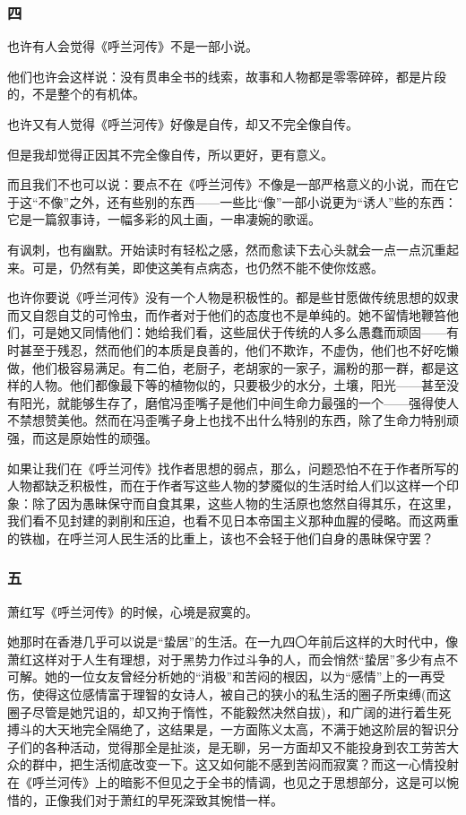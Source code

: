 \subsubsection*{四}
\par 也许有人会觉得《呼兰河传》不是一部小说。
\par 他们也许会这样说：没有贯串全书的线索，故事和人物都是零零碎碎，都是片段的，不是整个的有机体。
\par 也许又有人觉得《呼兰河传》好像是自传，却又不完全像自传。
\par 但是我却觉得正因其不完全像自传，所以更好，更有意义。
\par 而且我们不也可以说：要点不在《呼兰河传》不像是一部严格意义的小说，而在它于这“不像”之外，还有些别的东西——一些比“像”一部小说更为“诱人”些的东西：它是一篇叙事诗，一幅多彩的风土画，一串凄婉的歌谣。
\par 有讽刺，也有幽默。开始读时有轻松之感，然而愈读下去心头就会一点一点沉重起来。可是，仍然有美，即使这美有点病态，也仍然不能不使你炫惑。
\par 也许你要说《呼兰河传》没有一个人物是积极性的。都是些甘愿做传统思想的奴隶而又自怨自艾的可怜虫，而作者对于他们的态度也不是单纯的。她不留情地鞭笞他们，可是她又同情他们：她给我们看，这些屈伏于传统的人多么愚蠢而顽固——有时甚至于残忍，然而他们的本质是良善的，他们不欺诈，不虚伪，他们也不好吃懒做，他们极容易满足。有二伯，老厨子，老胡家的一家子，漏粉的那一群，都是这样的人物。他们都像最下等的植物似的，只要极少的水分，土壤，阳光——甚至没有阳光，就能够生存了，磨倌冯歪嘴子是他们中间生命力最强的一个——强得使人不禁想赞美他。然而在冯歪嘴子身上也找不出什么特别的东西，除了生命力特别顽强，而这是原始性的顽强。
\par 如果让我们在《呼兰河传》找作者思想的弱点，那么，问题恐怕不在于作者所写的人物都缺乏积极性，而在于作者写这些人物的梦魇似的生活时给人们以这样一个印象：除了因为愚昧保守而自食其果，这些人物的生活原也悠然自得其乐，在这里，我们看不见封建的剥削和压迫，也看不见日本帝国主义那种血腥的侵略。而这两重的铁枷，在呼兰河人民生活的比重上，该也不会轻于他们自身的愚昧保守罢？
\subsubsection*{五}
\par 萧红写《呼兰河传》的时候，心境是寂寞的。
\par 她那时在香港几乎可以说是“蛰居”的生活。在一九四〇年前后这样的大时代中，像萧红这样对于人生有理想，对于黑势力作过斗争的人，而会悄然“蛰居”多少有点不可解。她的一位女友曾经分析她的“消极”和苦闷的根因，以为“感情”上的一再受伤，使得这位感情富于理智的女诗人，被自己的狭小的私生活的圈子所束缚(而这圈子尽管是她咒诅的，却又拘于惰性，不能毅然决然自拔)，和广阔的进行着生死搏斗的大天地完全隔绝了，这结果是，一方面陈义太高，不满于她这阶层的智识分子们的各种活动，觉得那全是扯淡，是无聊，另一方面却又不能投身到农工劳苦大众的群中，把生活彻底改变一下。这又如何能不感到苦闷而寂寞？而这一心情投射在《呼兰河传》上的暗影不但见之于全书的情调，也见之于思想部分，这是可以惋惜的，正像我们对于萧红的早死深致其惋惜一样。
\par {}
\par {}




